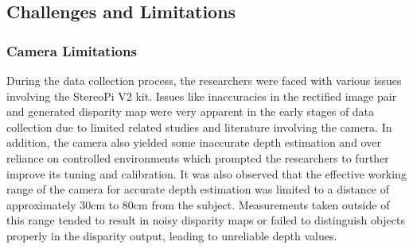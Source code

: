 \subsection{Challenges and Limitations}

\subsubsection{Camera Limitations}
During the data collection process, the researchers were faced with various issues involving the StereoPi V2 kit. Issues like inaccuracies in the rectified image pair and generated disparity map were very apparent in the early stages of data collection due to limited related studies and literature involving the camera. In addition, the camera also yielded some inaccurate depth estimation and over reliance on controlled environments which prompted the researchers to further improve its tuning and calibration. It was also observed that the effective working range of the camera for accurate depth estimation was limited to a distance of approximately 30cm to 80cm from the subject. Measurements taken outside of this range tended to result in noisy disparity maps or failed to distinguish objects properly in the disparity output, leading to unreliable depth values.




